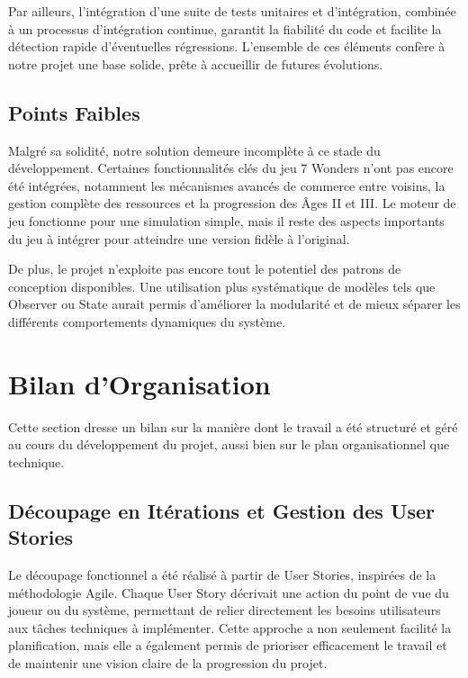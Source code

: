 Par ailleurs, l’intégration d’une suite de tests unitaires et d’intégration, combinée à un processus d’intégration continue, garantit la fiabilité du code et facilite la détection rapide d’éventuelles régressions. L’ensemble de ces éléments confère à notre projet une base solide, prête à accueillir de futures évolutions.

\subsection{Points Faibles}

Malgré sa solidité, notre solution demeure incomplète à ce stade du développement. Certaines fonctionnalités clés du jeu 7 Wonders n’ont pas encore été intégrées, notamment les mécanismes avancés de commerce entre voisins, la gestion complète des ressources et la progression des Âges II et III. Le moteur de jeu fonctionne pour une simulation simple, mais il reste des aspects importants du jeu à intégrer pour atteindre une version fidèle à l'original.

De plus, le projet n’exploite pas encore tout le potentiel des patrons de conception disponibles. Une utilisation plus systématique de modèles tels que Observer ou State aurait permis d’améliorer la modularité et de mieux séparer les différents comportements dynamiques du système.

\section{Bilan d'Organisation}
\label{sec:bilan}

Cette section dresse un bilan sur la manière dont le travail a été structuré et géré au cours du développement du projet, aussi bien sur le plan organisationnel que technique.

\subsection{Découpage en Itérations et Gestion des User Stories}
\label{sec:user-story}

Le découpage fonctionnel a été réalisé à partir de User Stories, inspirées de la méthodologie Agile. Chaque User Story décrivait une action du point de vue du joueur ou du système, permettant de relier directement les besoins utilisateurs aux tâches techniques à implémenter. Cette approche a non seulement facilité la planification, mais elle a également permis de prioriser efficacement le travail et de maintenir une vision claire de la progression du projet.

